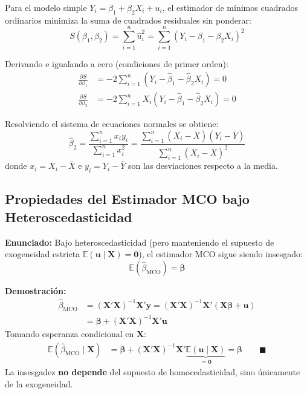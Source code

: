 \documentclass[12pt,a4paper]{report}
\theoremstyle{definition}
\theoremstyle{remark}
\newcommand{\E}{\mathbb{E}}
\newcommand{\betahat}{\hat{\beta}}
\newcommand{\uhat}{\hat{u}}
\newcommand{\OLS}{\text{MCO}}
\begin{document}
Para el modelo simple $Y_i = \beta_1 + \beta_2 X_i + u_i$, el estimador de mínimos cuadrados ordinarios minimiza la suma de cuadrados residuales sin ponderar:
\begin{equation}
  S(\beta_1, \beta_2) = \sum_{i=1}^n \uhat_i^2 = \sum_{i=1}^n (Y_i - \beta_1 - \beta_2 X_i)^2
  \label{eq:ols_obj}
\end{equation}

Derivando e igualando a cero (condiciones de primer orden):
\begin{align}
  \frac{\partial S}{\partial \beta_1} &= -2\sum_{i=1}^n (Y_i - \betahat_1 - \betahat_2 X_i) = 0 \label{eq:cpo1}\\
  \frac{\partial S}{\partial \beta_2} &= -2\sum_{i=1}^n X_i(Y_i - \betahat_1 - \betahat_2 X_i) = 0 \label{eq:cpo2}
\end{align}

Resolviendo el sistema de ecuaciones normales se obtiene:
\begin{equation}
  \betahat_2 = \frac{\sum_{i=1}^n x_i y_i}{\sum_{i=1}^n x_i^2} = \frac{\sum_{i=1}^n (X_i - \bar{X})(Y_i - \bar{Y})}{\sum_{i=1}^n (X_i - \bar{X})^2}
  \label{eq:beta2hat}
\end{equation}
donde $x_i = X_i - \bar{X}$ e $y_i = Y_i - \bar{Y}$ son las desviaciones respecto a la media.

\subsection{Propiedades del Estimador MCO bajo Heteroscedasticidad}

\begin{tcolorbox}[teoremastyle, title={Teorema 11.1: Insesgadez de MCO bajo Heteroscedasticidad}]
  \textbf{Enunciado:} Bajo heteroscedasticidad (pero manteniendo el supuesto de exogeneidad estricta $\E(\mathbf{u} \mid \mathbf{X}) = \mathbf{0}$), el estimador MCO sigue siendo insesgado:
  \begin{equation}
    \E(\betahat_{\OLS}) = \boldsymbol{\beta}
    \label{eq:insesgadez}
  \end{equation}

  \textbf{Demostración:}
  \begin{align*}
    \betahat_{\OLS} &= (\mathbf{X}'\mathbf{X})^{-1}\mathbf{X}'\mathbf{y}
    = (\mathbf{X}'\mathbf{X})^{-1}\mathbf{X}'(\mathbf{X}\boldsymbol{\beta} + \mathbf{u})\\
    &= \boldsymbol{\beta} + (\mathbf{X}'\mathbf{X})^{-1}\mathbf{X}'\mathbf{u}
  \end{align*}
  Tomando esperanza condicional en $\mathbf{X}$:
  \begin{align*}
    \E(\betahat_{\OLS} \mid \mathbf{X}) &= \boldsymbol{\beta} + (\mathbf{X}'\mathbf{X})^{-1}\mathbf{X}'\underbrace{\E(\mathbf{u} \mid \mathbf{X})}_{=\mathbf{0}} = \boldsymbol{\beta} \qquad \blacksquare
  \end{align*}
  La insesgadez \textbf{no depende} del supuesto de homocedasticidad, sino únicamente de la exogeneidad.
\end{tcolorbox}
\end{document}
